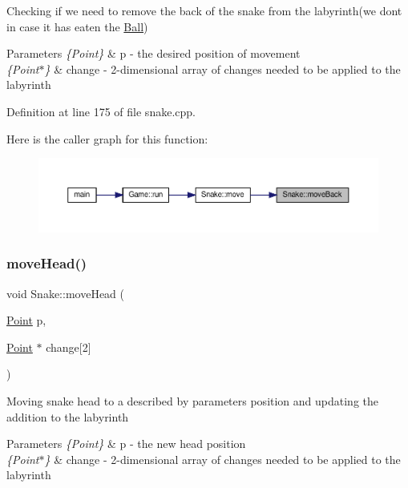 Checking if we need to remove the back of the snake from the labyrinth(we don\textquotesingle{}t in case it has eaten the \mbox{\hyperlink{class_ball}{Ball}}) 
\begin{DoxyParams}{Parameters}
{\em \{\+Point\}} & p -\/ the desired position of movement \\
\hline
{\em \{\+Point$\ast$\}} & change -\/ 2-\/dimensional array of changes needed to be applied to the labyrinth \\
\hline
\end{DoxyParams}


Definition at line 175 of file snake.\+cpp.

Here is the caller graph for this function\+:
\nopagebreak
\begin{figure}[H]
\begin{center}
\leavevmode
\includegraphics[width=350pt]{class_snake_a577892c68b457316f7a9f3944c464569_icgraph}
\end{center}
\end{figure}
\mbox{\label{class_snake_a59b2f5b18ab563d1583dfb15064784a0}} 
\subsubsection{\texorpdfstring{moveHead()}{moveHead()}}
{\footnotesize\ttfamily void Snake\+::move\+Head (\begin{DoxyParamCaption}\item[{\mbox{\hyperlink{common_8h_aa9cfdb80b4ca12013a2de8a3b9b97981}{Point}}}]{p,  }\item[{\mbox{\hyperlink{common_8h_aa9cfdb80b4ca12013a2de8a3b9b97981}{Point}} $\ast$}]{change\mbox{[}2\mbox{]} }\end{DoxyParamCaption})\hspace{0.3cm}{\ttfamily [private]}}

Moving snake head to a described by parameters position and updating the addition to the labyrinth 
\begin{DoxyParams}{Parameters}
{\em \{\+Point\}} & p -\/ the new head position \\
\hline
{\em \{\+Point$\ast$\}} & change -\/ 2-\/dimensional array of changes needed to be applied to the labyrinth \\
\hline
\end{DoxyParams}



